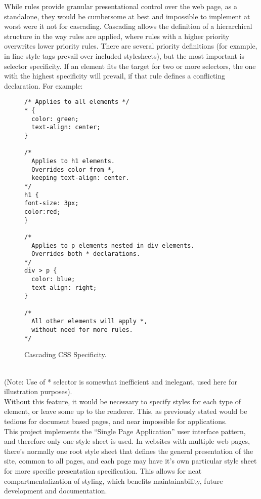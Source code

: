 While rules provide granular presentational control over the web page, as a standalone, they would be cumbersome at best
and impossible to implement at worst were it not for cascading. Cascading allows the definition of a hierarchical structure
in the way rules are applied, where rules with a higher priority overwrites lower priority rules. There are several
priority definitions (for example, in line style tags prevail over included stylesheets), but the most important is
selector specificity. If an element fits the target for two or more selectors, the one with the highest specificity will
prevail, if that rule defines a conflicting declaration. For example:
\begin{figure}[h]
\centering
{}
\begin{verbatim}
/* Applies to all elements */
* {
  color: green;
  text-align: center;
}

/*
  Applies to h1 elements.
  Overrides color from *,
  keeping text-align: center.
*/
h1 {
font-size: 3px;
color:red;
}

/*
  Applies to p elements nested in div elements.
  Overrides both * declarations.
*/
div > p {
  color: blue;
  text-align: right;
}

/*
  All other elements will apply *,
  without need for more rules.
*/
\end{verbatim}
\caption{Cascading CSS Specificity.}
\end{figure}
\\(Note: Use of * selector is somewhat inefficient and inelegant, used here for illustration purposes).\\

Without this feature, it would be necessary to specify styles for each type of element, or leave some up to the renderer.
This, as previously stated would be tedious for document based pages, and near impossible for applications.\\

This project implements the ``Single Page Application'' user interface pattern, and therefore only one style sheet is used.
In websites with multiple web pages, there's normally one root style sheet that defines the general presentation of the
site, common to all pages, and each page may have it's own particular style sheet for more specific presentation
specification. This allows for neat compartmentalization of styling, which benefits maintainability, future development and
documentation.\\

